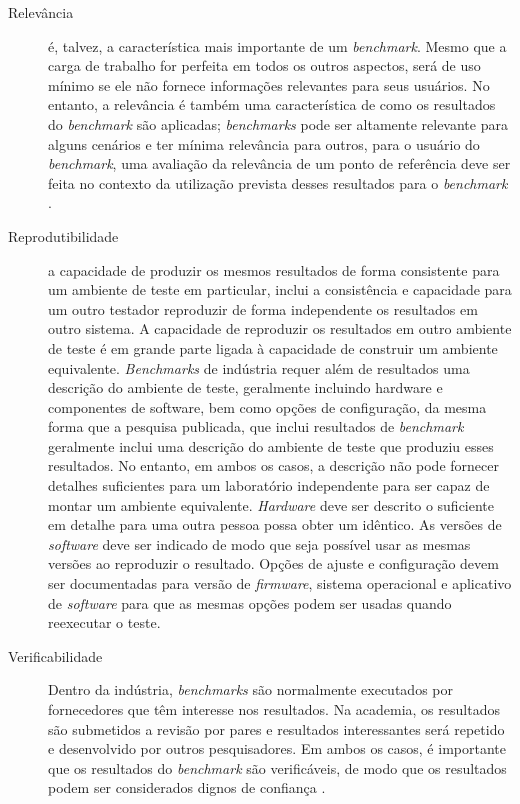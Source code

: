 \begin{description}
	\item[Relevância] é, talvez, a característica mais importante de um \textit{benchmark}. Mesmo que a carga de trabalho for perfeita em todos os outros aspectos, será de uso mínimo se ele não fornece informações relevantes para seus usuários. No entanto, a relevância é também uma característica de como os resultados do \textit{benchmark} são aplicadas; \textit{benchmarks} pode ser altamente relevante para alguns cenários e ter mínima relevância para outros, para o usuário do \textit{benchmark}, uma avaliação da relevância de um ponto de referência deve ser feita no contexto da utilização prevista desses resultados para o \textit{benchmark} \cite{Kistowski2015}. 
	
	\item[Reprodutibilidade] a capacidade de produzir os mesmos resultados de forma consistente para um ambiente de teste em particular, inclui a consistência e capacidade para um outro testador reproduzir de forma independente os resultados em outro sistema. A capacidade de reproduzir os resultados em outro ambiente de teste é em grande parte ligada à capacidade de construir um ambiente equivalente. \textit{Benchmarks} de indústria requer além de resultados uma descrição do ambiente de teste, geralmente incluindo hardware e componentes de software, bem como opções de configuração, da mesma forma que a pesquisa publicada, que inclui resultados de \textit{benchmark} geralmente inclui uma descrição do ambiente de teste que produziu esses resultados. No entanto, em ambos os casos, a descrição não pode fornecer detalhes suficientes para um laboratório independente para ser capaz de montar um ambiente equivalente. \textit{Hardware} deve ser descrito o suficiente em detalhe para uma outra pessoa possa obter um idêntico. As versões de \textit{software} deve ser indicado de modo que seja possível usar as mesmas versões ao reproduzir o resultado. Opções de ajuste e configuração devem ser documentadas para versão de \textit{firmware}, sistema operacional e aplicativo de \textit{software} para que as mesmas opções podem ser usadas quando reexecutar o teste. \cite{Kistowski2015}
	
	\item[Verificabilidade] Dentro da indústria, \textit{benchmarks} são normalmente executados por fornecedores que têm interesse nos resultados. Na academia, os resultados são submetidos a revisão por pares e resultados interessantes será repetido e desenvolvido por outros pesquisadores. Em ambos os casos, é importante que os resultados do \textit{benchmark} são verificáveis, de modo que os resultados podem ser considerados dignos de confiança \cite{Kistowski2015}. 
	

\end{description}
